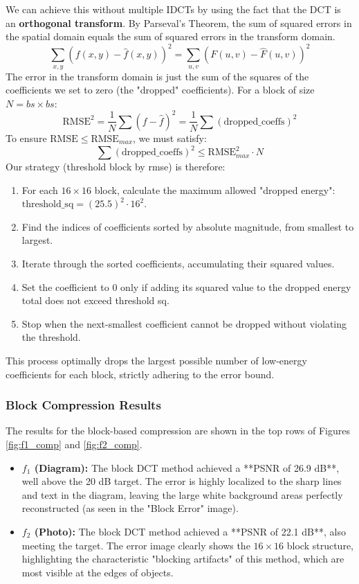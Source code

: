 \documentclass[11pt,a4paper]{article}
\begin{document}
We can achieve this without multiple IDCTs by using the fact that the DCT is an \textbf{orthogonal transform}. By Parseval's Theorem, the sum of squared errors in the spatial domain equals the sum of squared errors in the transform domain.
$$ \sum_{x,y} (f(x,y) - \hat{f}(x,y))^2 = \sum_{u,v} (F(u,v) - \hat{F}(u,v))^2 $$
The error in the transform domain is just the sum of the squares of the coefficients we set to zero (the "dropped" coefficients). For a block of size $N = bs \times bs$:
$$ \text{RMSE}^2 = \frac{1}{N} \sum (f - \hat{f})^2 = \frac{1}{N} \sum (\text{dropped\_coeffs})^2 $$
To ensure $\text{RMSE} \le \text{RMSE}_{max}$, we must satisfy:
$$ \sum (\text{dropped\_coeffs})^2 \le \text{RMSE}_{max}^2 \cdot N $$
Our strategy (threshold block by rmse) is therefore:
\begin{enumerate}
    \item For each $16 \times 16$ block, calculate the maximum allowed "dropped energy": $\text{threshold\_sq} = (25.5)^2 \cdot 16^2$.
    \item Find the indices of coefficients sorted by absolute magnitude, from smallest to largest.
    \item Iterate through the sorted coefficients, accumulating their squared values.
    \item Set the coefficient to 0 only if adding its squared value to the dropped energy total does not exceed threshold sq.
    \item Stop when the next-smallest coefficient cannot be dropped without violating the threshold.
\end{enumerate}
This process optimally drops the largest possible number of low-energy coefficients for each block, strictly adhering to the error bound.


\subsubsection{Block Compression Results}
The results for the block-based compression are shown in the top rows of Figures \ref{fig:f1_comp} and \ref{fig:f2_comp}.
\begin{itemize}
    \item \textbf{$f_1$ (Diagram):} The block DCT method achieved a **PSNR of 26.9 dB**, well above the 20 dB target. The error is highly localized to the sharp lines and text in the diagram, leaving the large white background areas perfectly reconstructed (as seen in the "Block Error" image).
    \item \textbf{$f_2$ (Photo):} The block DCT method achieved a **PSNR of 22.1 dB**, also meeting the target. The error image clearly shows the $16 \times 16$ block structure, highlighting the characteristic "blocking artifacts" of this method, which are most visible at the edges of objects.
\end{itemize}
\end{document}
